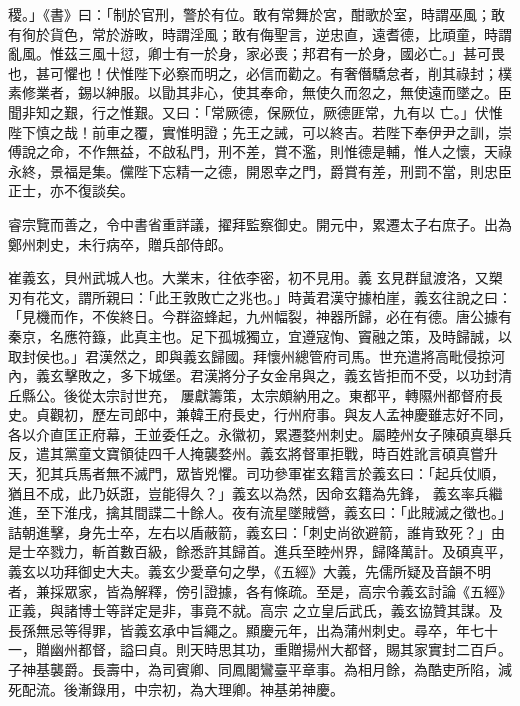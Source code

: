 \begin{pinyinscope}
 稷。」《書》曰：「制於官刑，警於有位。敢有常舞於宮，酣歌於室，時謂巫風；敢有徇於貨色，常於游畋，時謂淫風；敢有侮聖言，逆忠直，遠耆德，比頑童，時謂亂風。惟茲三風十愆，卿士有一於身，家必喪；邦君有一於身，國必亡。」甚可畏也，甚可懼也！伏惟陛下必察而明之，必信而勸之。有奢僭驕怠者，削其祿封；樸素修業者，錫以紳服。以勖其非心，使其奉命，無使久而忽之，無使遠而墜之。臣聞非知之艱，行之惟艱。又曰：「常厥德，保厥位，厥德匪常，九有以
 亡。」伏惟陛下慎之哉！前車之覆，實惟明證；先王之誡，可以終吉。若陛下奉伊尹之訓，崇傅說之命，不作無益，不啟私門，刑不差，賞不濫，則惟德是輔，惟人之懷，天祿永終，景福是集。儻陛下忘精一之德，開恩幸之門，爵賞有差，刑罰不當，則忠臣正士，亦不復談矣。



 睿宗覽而善之，令中書省重詳議，擢拜監察御史。開元中，累遷太子右庶子。出為鄭州刺史，未行病卒，贈兵部侍郎。



 崔義玄，貝州武城人也。大業末，往依李密，初不見用。義
 玄見群鼠渡洛，又槊刃有花文，謂所親曰：「此王敦敗亡之兆也。」時黃君漢守據柏崖，義玄往說之曰：「見機而作，不俟終日。今群盜蜂起，九州幅裂，神器所歸，必在有德。唐公據有秦京，名應符籙，此真主也。足下孤城獨立，宜遵寇恂、竇融之策，及時歸誠，以取封侯也。」君漢然之，即與義玄歸國。拜懷州總管府司馬。世充遣將高毗侵掠河內，義玄擊敗之，多下城堡。君漢將分子女金帛與之，義玄皆拒而不受，以功封清丘縣公。後從太宗討世充，
 屢獻籌策，太宗頗納用之。東都平，轉隰州都督府長史。貞觀初，歷左司郎中，兼韓王府長史，行州府事。與友人孟神慶雖志好不同，各以介直匡正府幕，王並委任之。永徽初，累遷婺州刺史。屬睦州女子陳碩真舉兵反，遣其黨童文寶領徒四千人掩襲婺州。義玄將督軍拒戰，時百姓訛言碩真嘗升天，犯其兵馬者無不滅門，眾皆兇懼。司功參軍崔玄籍言於義玄曰：「起兵仗順，猶且不成，此乃妖誑，豈能得久？」義玄以為然，因命玄籍為先鋒，
 義玄率兵繼進，至下淮戌，擒其間諜二十餘人。夜有流星墜賊營，義玄曰：「此賊滅之徵也。」詰朝進擊，身先士卒，左右以盾蔽箭，義玄曰：「刺史尚欲避箭，誰肯致死？」由是士卒戮力，斬首數百級，餘悉許其歸首。進兵至睦州界，歸降萬計。及碩真平，義玄以功拜御史大夫。義玄少愛章句之學，《五經》大義，先儒所疑及音韻不明者，兼採眾家，皆為解釋，傍引證據，各有條疏。至是，高宗令義玄討論《五經》正義，與諸博士等詳定是非，事竟不就。高宗
 之立皇后武氏，義玄協贊其謀。及長孫無忌等得罪，皆義玄承中旨繩之。顯慶元年，出為蒲州刺史。尋卒，年七十一，贈幽州都督，謚曰貞。則天時思其功，重贈揚州大都督，賜其家實封二百戶。子神基襲爵。長壽中，為司賓卿、同鳳閣鸞臺平章事。為相月餘，為酷吏所陷，減死配流。後漸錄用，中宗初，為大理卿。神基弟神慶。




\end{pinyinscope}
